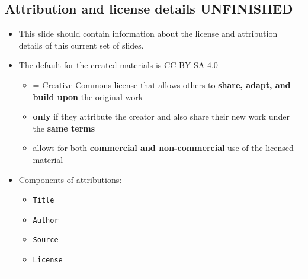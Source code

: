 \documentclass[
  letterpaper,
  DIV=11,
  numbers=noendperiod]{scrartcl}
\providecommand{\tightlist}{%
  \setlength{\itemsep}{0pt}\setlength{\parskip}{0pt}}
\begin{document}
\subsection{Attribution and license details
UNFINISHED}\label{attribution-and-license-details-unfinished}

\begin{itemize}
\item
  This slide should contain information about the license and
  attribution details of this current set of slides.
\item
  The default for the created materials is
  \href{https://creativecommons.org/licenses/by/4.0/}{CC-BY-SA 4.0}

  \begin{itemize}
  \tightlist
  \item
    = Creative Commons license that allows others to \textbf{share,
    adapt, and build upon} the original work
  \item
    \textbf{only} if they attribute the creator and also share their new
    work under the \textbf{same terms}
  \item
    allows for both \textbf{commercial and non-commercial} use of the
    licensed material
  \end{itemize}
\item
  Components of attributions:

  \begin{itemize}
  \tightlist
  \item
    \texttt{Title}
  \item
    \texttt{Author}
  \item
    \texttt{Source}
  \item
    \texttt{License}
  \end{itemize}
\end{itemize}

\begin{center}\rule{0.5\linewidth}{0.5pt}\end{center}
\end{document}

